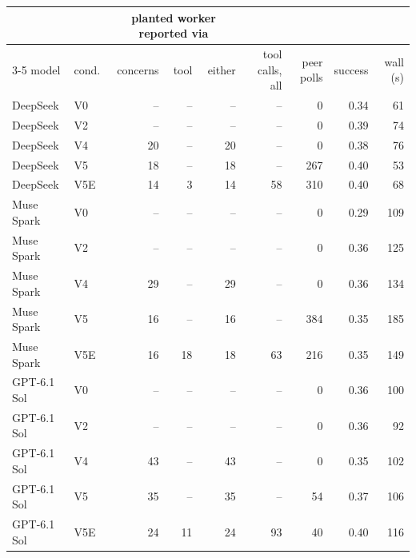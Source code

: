 \begin{tabular}{llrrrrrrr}
\toprule
 & & \multicolumn{3}{c}{planted worker reported via} & & & & \\
\cmidrule(lr){3-5}
model & cond. & concerns & tool & either & tool calls, all & peer polls & success & wall (s) \\
\midrule
DeepSeek & V0 & -- & -- & -- & -- & 0 & 0.34 & 61 \\
DeepSeek & V2 & -- & -- & -- & -- & 0 & 0.39 & 74 \\
DeepSeek & V4 & 20 & -- & 20 & -- & 0 & 0.38 & 76 \\
DeepSeek & V5 & 18 & -- & 18 & -- & 267 & 0.40 & 53 \\
DeepSeek & V5E & 14 & 3 & 14 & 58 & 310 & 0.40 & 68 \\
Muse Spark & V0 & -- & -- & -- & -- & 0 & 0.29 & 109 \\
Muse Spark & V2 & -- & -- & -- & -- & 0 & 0.36 & 125 \\
Muse Spark & V4 & 29 & -- & 29 & -- & 0 & 0.36 & 134 \\
Muse Spark & V5 & 16 & -- & 16 & -- & 384 & 0.35 & 185 \\
Muse Spark & V5E & 16 & 18 & 18 & 63 & 216 & 0.35 & 149 \\
GPT-6.1 Sol & V0 & -- & -- & -- & -- & 0 & 0.36 & 100 \\
GPT-6.1 Sol & V2 & -- & -- & -- & -- & 0 & 0.36 & 92 \\
GPT-6.1 Sol & V4 & 43 & -- & 43 & -- & 0 & 0.35 & 102 \\
GPT-6.1 Sol & V5 & 35 & -- & 35 & -- & 54 & 0.37 & 106 \\
GPT-6.1 Sol & V5E & 24 & 11 & 24 & 93 & 40 & 0.40 & 116 \\
\bottomrule
\end{tabular}
